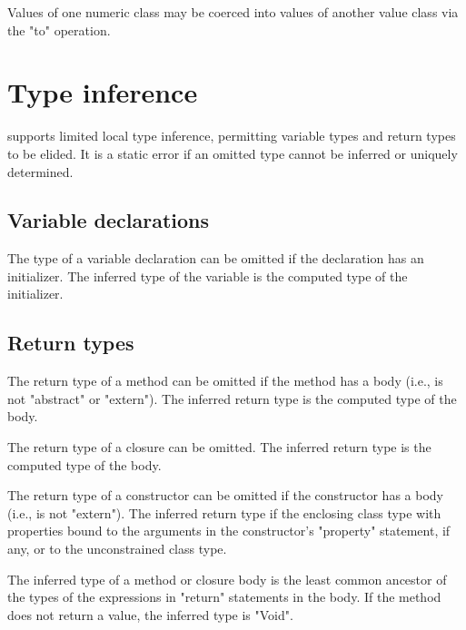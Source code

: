 Values of one numeric class may be coerced into values of
another value class via the \xcd"to" operation.





\section{Type inference}
\label{TypeInference}

\XtenCurrVer{} supports limited local type inference, permitting
variable types and return types to be elided.
It is a static error if an omitted type cannot be inferred or
uniquely determined.

\subsection{Variable declarations}

The type of a variable declaration can be omitted if the
declaration has an initializer.  The inferred type of the
variable is the computed type of the initializer.

\subsection{Return types}

The return type of a method can be omitted if the method has a
body (i.e., is not \xcd"abstract" or \xcd"extern").  The
inferred return type is the computed type of the body.

The return type of a closure can be omitted.
The inferred return type is the computed type of the body.

The return type of a constructor can be omitted if the
constructor has a body (i.e., is not \xcd"extern").
The inferred return type if the enclosing class type with
properties bound to the arguments in the constructor's \xcd"property"
statement, if any, or to the unconstrained class type.

The inferred type of a method or closure body is the least common ancestor
of the types of the expressions in \xcd"return" statements
in the body.  If the method does not return a value, the
inferred type is \xcd"Void".

